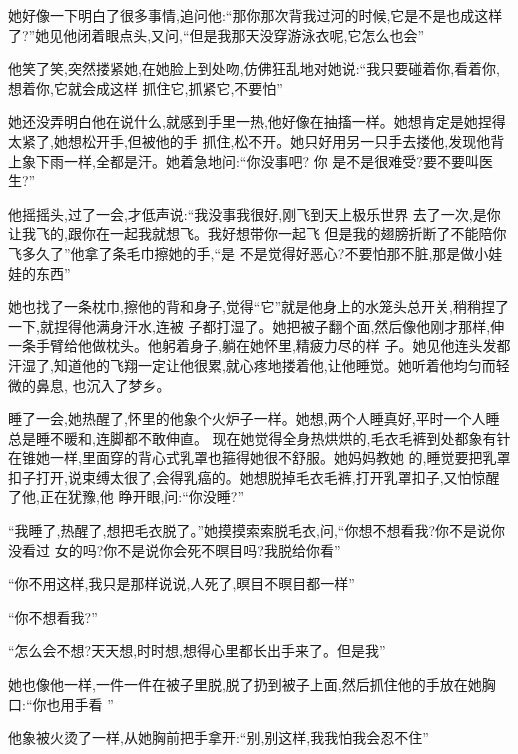 ﻿\documentclass[12pt]{article}
\begin{document}
她好像一下明白了很多事情,追问他:``那\myrule 你那次背我\myrule 过河的时候,它是不是\myrule 也成这样
了?''她见他闭着眼点头,又问,``但是我那天没穿\myrule 游泳衣呢,它怎么也会\myrule ''
 
 

他笑了笑,突然搂紧她,在她脸上到处吻,仿佛狂乱地对她说:``我只要碰着你,看着你,想着你,它就会成这样\myrule 
抓住它,抓紧它,不要怕\myrule ''

她还没弄明白他在说什么,就感到手里一热,他好像在抽搐一样。她想肯定是她捏得太紧了,她想松开手,但被他的手
抓住,松不开。她只好用另一只手去搂他,发现他背上象下雨一样,全都是汗。她着急地问:``你\myrule 没事吧? 你
\myrule 是不是\myrule 很难受?要不要\myrule 叫医生?''

他摇摇头,过了一会,才低声说:``我没事\myrule 我很好\myrule ,刚飞到\myrule 天上\myrule 极乐世界\myrule 
去了一次,是你让我飞的\myrule ,跟你在一起\myrule 我就\myrule 想飞\myrule 。我好想\myrule 带你一起飞
\myrule 但是\myrule 我的翅膀\myrule 折断了\myrule 不能陪你飞多久了\myrule ''他拿了条毛巾擦她的手,``是
不是觉得好恶心?不要怕\myrule 那不脏,那是\myrule 做小娃娃的东西\myrule ''

她也找了一条枕巾,擦他的背和身子,觉得``它''就是他身上的水笼头总开关,稍稍捏了一下,就捏得他满身汗水,连被
子都打湿了。她把被子翻个面,然后像他刚才那样,伸一条手臂给他做枕头。他躬着身子,躺在她怀里,精疲力尽的样
子。她见他连头发都汗湿了,知道他的飞翔一定让他很累,就心疼地搂着他,让他睡觉。她听着他均匀而轻微的鼻息,
也沉入了梦乡。

睡了一会,她热醒了,怀里的他象个火炉子一样。她想,两个人睡真好,平时一个人睡总是睡不暖和,连脚都不敢伸直。
现在她觉得全身热烘烘的,毛衣毛裤到处都象有针在锥她一样,里面穿的背心式乳罩也箍得她很不舒服。她妈妈教她
的,睡觉要把乳罩扣子打开,说束缚太很了,会得乳癌的。她想脱掉毛衣毛裤,打开乳罩扣子,又怕惊醒了他,正在犹豫,他
睁开眼,问:``你\myrule 没睡?''

``我睡了,热醒了,想把毛衣脱了。''她摸摸索索脱毛衣,问,``你\myrule 想不想看我?你不是说\myrule 你没看过
\myrule 女的吗?你不是说你会\myrule 死不暝目吗?我\myrule 脱给你看\myrule ''

``你不用这样,我只是那样说说\myrule ,人死了,暝目不暝目\myrule 都一样\myrule ''

``你不想看我?''

``怎么会不想?天天想,时时想,想得心里都长出手来了。但是我\myrule ''

她也像他一样,一件一件在被子里脱,脱了扔到被子上面,然后抓住他的手放在她胸口:``你也\myrule 用手看
\myrule ''

他象被火烫了一样,从她胸前把手拿开:``别,别这样,我\myrule 我怕我会\myrule 忍不住\myrule ''
\end{document}
